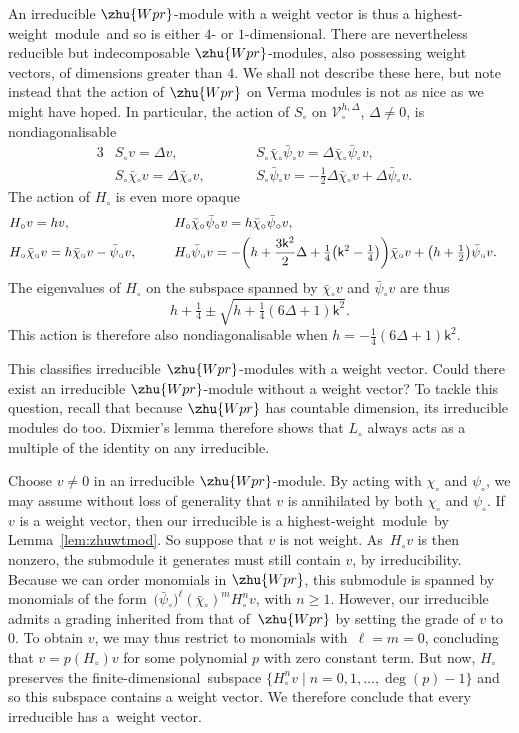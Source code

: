 \documentclass[10pt,a4paper]{amsart}
\numberwithin{equation}{section}
\newcommand{\bchi}{\bar{\chi}{}} %
\newcommand{\bpsi}{\bar{\psi}{}} %
\newcommand{\kk}{\mathsf{k}} %
\renewcommand{\ge}{\geqslant} %
\DeclarePairedDelimiter{\brac}{\lparen}{\rparen} %
\newcommand{\VOA}[1]{\mathsf{#1}} %
\newcommand{\Mod}[1]{\mathcal{#1}} %
\newcommand{\uwalg}[2]{\VOA{W}^{#1}_{\mathrm{#2}}} %
\newcommand{\upr}[1][\kk]{\uwalg{#1}{pr}} %
\newcommand{\zh}[1]{#1_{\circ}} %
\newcommand{\zhver}[1]{\zh{\Mod{V}}^{#1}} %
\newcommand{\fdim}{finite-dimensional}
\newcommand{\hw}{highest-weight}
\newcommand{\hwm}{\hw\ module}
\def\smash#1{#1}
\def\upr{Wpr}
\begin{document}
An irreducible \smash{$\zhu{\upr}$}-module with a weight vector is thus a \hwm\ and so is either $4$- or $1$-dimensional.
There are nevertheless reducible but indecomposable \smash{$\zhu{\upr}$}-modules, also possessing weight vectors, of dimensions greater than $4$.
We shall not describe these here, but note instead that the action of \smash{$\zhu{\upr}$} on Verma modules is not as nice as we might have hoped.
In particular, the action of $\zh{S}$ on \smash{$\zhver{h,\Delta}$}, $\Delta\ne0$, is nondiagonalisable
\begin{alignat*}{3}
& \zh{S} v = \Delta v, \qquad&&
		\zh{S}\zh{\bchi}\zh{\bpsi} v = \Delta \zh{\bchi}\zh{\bpsi} v,&
\\
&\zh{S}\zh{\bchi} v = \Delta \zh{\bchi} v,\qquad&&
		\zh{S}\zh{\bpsi} v = -\frac{1}{2} \Delta \zh{\bchi} v + \Delta \zh{\bpsi} v.&
\end{alignat*}
The action of $\zh{H}$ is even more opaque
\begin{alignat*}{3}
		&\zh{H} v = hv,\qquad&&
		\zh{H}\zh{\bchi}\zh{\bpsi} v = h \zh{\bchi}\zh{\bpsi} v,&
\\
		&\zh{H}\zh{\bchi} v = h \zh{\bchi} v - \zh{\bpsi} v, \qquad&&
		\zh{H}\zh{\bpsi} v = -\brac[\bigg]{h + \frac{3\kk^2}{2}\Delta + \tfrac{1}{4}\bigl(\kk^2-\tfrac{1}{4}\bigr)} \zh{\bchi} v + \bigl(h+\tfrac{1}{2}\bigr) \zh{\bpsi} v.&
\end{alignat*}
The eigenvalues of $\zh{H}$ on the subspace spanned by $\zh{\bchi} v$ and $\zh{\bpsi} v$ are thus
\[
h+\tfrac{1}{4} \pm \sqrt{h+\tfrac{1}{4}(6\Delta+1)\kk^2}.
\]
This action is therefore also nondiagonalisable when $h = -\frac{1}{4}(6\Delta+1)\kk^2$.

This classifies irreducible \smash{$\zhu{\upr}$}-modules with a weight vector.
Could there exist an irreducible \smash{$\zhu{\upr}$}-module without a weight vector?
To tackle this question, recall that because \smash{$\zhu{\upr}$} has countable dimension, its irreducible modules do too.
Dixmier's lemma therefore shows that $\zh{L}$ always acts as a multiple of the identity on any irreducible.

Choose $v\ne0$ in an irreducible \smash{$\zhu{\upr}$}-module.
By acting with $\zh{\chi}$ and $\zh{\psi}$, we may assume without loss of generality that $v$ is annihilated by both $\zh{\chi}$ and $\zh{\psi}$.
If $v$ is a weight vector, then our irreducible is a \hwm\ by Lemma~\ref{lem:zhuwtmod}.
So suppose that $v$ is not weight.
As~$\zh{H} v$ is then nonzero, the submodule it generates must still contain $v$, by irreducibility.
Because we can order monomials in \smash{$\zhu{\upr}$}, this submodule is spanned by monomials of the form~\smash{$\big(\zh{\bpsi}\big)^{\ell} (\zh{\bchi})^m \zh{H}^n v$}, with $n\ge1$.
However, our irreducible admits a grading inherited from that of~\smash{$\zhu{\upr}$} by setting the grade of $v$ to $0$.
To obtain $v$, we may thus restrict to monomials with~${\ell=m=0}$, concluding that $v = p(\zh{H}) v$ for some polynomial $p$ with zero constant term.
But now, $\zh{H}$ preserves the \fdim\ subspace $\{\zh{H}^n v \mid n=0,1,\dots,\deg(p)-1\}$ and so this subspace contains a weight vector.
We therefore conclude that every irreducible has a~weight vector.
%
\end{document}
